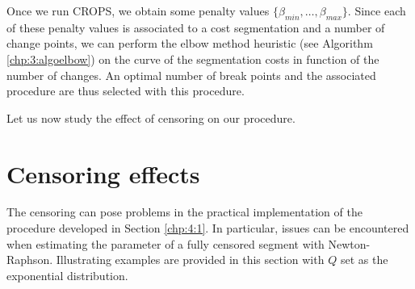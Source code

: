 Once we run CROPS, we obtain some penalty values $\{\beta_{min},\dots,\beta_{max}\}$. Since each of these penalty values is associated to a cost segmentation and a number of change points, we can perform the elbow method heuristic (see Algorithm \ref{chp:3:algoelbow}) on the curve of the segmentation costs in function of the number of changes. An optimal number of break points and the associated procedure are thus selected with this procedure.

Let us now study the effect of censoring on our procedure.

\section{Censoring effects}\label{chp:4:2}

%

The censoring can pose problems in the practical implementation of the procedure developed in Section \ref{chp:4:1}. In particular, issues can be encountered when estimating the parameter of a fully censored segment with Newton-Raphson. Illustrating examples are provided in this section with $Q$ set as the exponential distribution.

